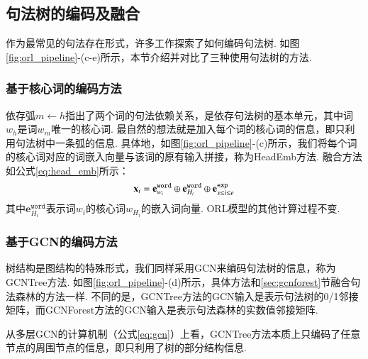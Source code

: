 
%
\subsection{句法树的编码及融合}
作为最常见的句法存在形式，许多工作探索了如何编码句法树. 如图\ref{fig:orl_pipeline}-(c-e)所示，本节介绍并对比了三种使用句法树的方法.

\subsubsection{基于核心词的编码方法}

依存弧$m \leftarrow h$指出了两个词的句法依赖关系，是依存句法树的基本单元，其中词$w_h$是词$w_m$唯一的核心词.
最自然的想法就是加入每个词的核心词的信息，即只利用句法树中一条弧的信息.
具体地，如图\ref{fig:orl_pipeline}-(c)所示，我们将每个词的核心词对应的词嵌入向量与该词的原有输入拼接，称为HeadEmb方法. 融合方法如公式\ref{eq:head_emb}所示：
\begin{equation}
    \setlength{\abovedisplayskip}{9pt}
    \setlength{\belowdisplayskip}{9pt}
    \label{eq:head_emb}
    \mathbf{x}_i = \mathbf{e}_{w_i}^{\texttt{word}} \oplus \mathbf{e}_{H_i}^{\texttt{word}} \oplus \mathbf{e}_{s\leq i\leq e}^{\texttt{exp}}
\end{equation}
其中$\mathbf{e}_{H_i}^{\texttt{word}}$表示词$w_i$的核心词$w_{H_i}$的嵌入词向量. ORL模型的其他计算过程不变.

\subsubsection{基于GCN的编码方法}

树结构是图结构的特殊形式，我们同样采用GCN来编码句法树的信息，称为GCNTree方法.
如图\ref{fig:orl_pipeline}-(d)所示，具体方法和\ref{sec:gcnforest}节融合句法森林的方法一样.
不同的是，GCNTree方法的GCN输入是表示句法树的0/1邻接矩阵，而GCNForest方法的GCN输入是表示句法森林的实数值邻接矩阵.


从多层GCN的计算机制（公式\ref{eq:gcn}）上看，GCNTree方法本质上只编码了任意节点的周围节点的信息，即只利用了树的部分结构信息.


